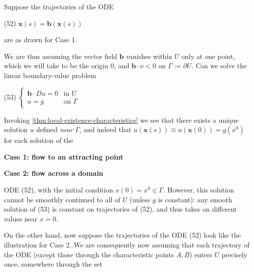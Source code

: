 \begin{example}
\label{ex:linear-transport-characteristics-flow}
Suppose the trajectories of the ODE

(52) \quad $\dot{\mathbf{x}}(s) = \mathbf{b}(\mathbf{x}(s))$

are as drawn for Case 1.

We are thus assuming the vector field $\mathbf{b}$ vanishes within $U$ only at one point, which we will take to be the origin $0$, and $\mathbf{b} \cdot \nu < 0$ on $\Gamma := \partial U$. Can we solve the linear boundary-value problem

(53) \quad $\begin{cases} \mathbf{b} \cdot Du = 0 & \text{in } U \\ u = g & \text{on } \Gamma \end{cases}$

Invoking \cref{thm:local-existence-characteristics} we see that there exists a unique solution $u$ defined \textit{near} $\Gamma$, and indeed that $u(\mathbf{x}(s)) \equiv u(\mathbf{x}(0)) = g(x^0)$ for each solution of the

\begin{figure}[h]\centering
\end{figure}

\textbf{Case 1: flow to an attracting point}

\begin{figure}[h]\centering
\end{figure}

\textbf{Case 2: flow across a domain}

ODE (52), with the initial condition $x(0) = x^0 \in \Gamma$. However, this solution cannot be smoothly continued to all of $U$ (unless $g$ is constant): any smooth solution of (53) is constant on trajectories of (52), and thus takes on different values near $x = 0$.

On the other hand, now suppose the trajectories of the ODE (52) look like the illustration for Case 2. We are consequently now assuming that each trajectory of the ODE (except those through the characteristic points $A, B$) enters $U$ precisely once, somewhere through the set


\end{example}
